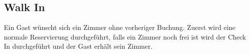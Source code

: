 \documentclass[../SubfileFeatures.tex]{subfiles}
\begin{document}
    \subsection{Walk In}
	Ein Gast wünscht sich ein Zimmer ohne vorheriger Buchung.
	Zuerst wird eine normale Reservierung durchgeführt, 
	falls ein Zimmer noch frei ist wird der Check In durchgeführt und der Gast erhält sein Zimmer. 
\end{document}
